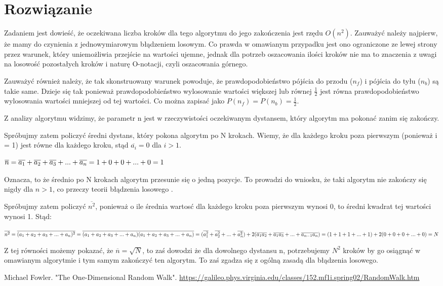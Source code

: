 \documentclass[12pt,oneside,a4paper]{book} %
\theoremstyle{break}
\begin{document}
\chapter*{Rozwiązanie}

Zadaniem jest dowieść, że oczekiwana liczba kroków dla tego algorytmu do jego zakończenia jest rzędu $O(n^2)$. Zauważyć należy najpierw, że mamy do czynienia z jednowymiarowym błądzeniem losowym. Co prawda w omawianym przypadku jest ono ograniczone ze lewej strony przez warunek, który uniemożliwia przejście na wartości ujemne, jednak dla potrzeb oszacowania ilości kroków nie ma to znaczenia z uwagi na losowość pozostałych kroków i naturę O-notacji, czyli oszacowania górnego.

Zauważyć również należy, że tak skonstruowany warunek powoduje, że prawdopodobieństwo pójścia do przodu ($n_f$) i pójścia do tyłu ($n_b$) są takie same. Dzieje się tak ponieważ prawdopodobieństwo wylosowanie wartości większej lub równej $\frac{1}{2}$ jest równa prawdopodobieństwo wylosowania wartości mniejszej od tej wartości. Co można zapisać jako $P(n_f)=P(n_b)=\frac{1}{2}$.

Z analizy algorytmu widzimy, że parametr n jest w rzeczywistości oczekiwanym dystansem, który algorytm ma pokonać zanim się zakończy.

Spróbujmy zatem policzyć średni dystans, który pokona algorytm po N krokach. Wiemy, że dla każdego kroku poza pierwszym (ponieważ i = 1) jest równe dla każdego kroku, stąd $\overline{a_i}=0$ dla $i > 1$.

\begin{math}
  \centering
  \overline{n}= \overline{a_1}+\overline{a_2}+\overline{a_3}+...+\overline{a_n}=1+0+0+...+0=1
\end{math}

Oznacza, to że średnio po N krokach algorytm przesunie się o jedną pozycje. To prowadzi do wniosku, że taki algorytm nie zakończy się nigdy dla $n > 1$, co przeczy teorii błądzenia losowego \cite{viriginaRandomWalk}.

Spróbujmy zatem policzyć $\overline{n^2}$, ponieważ o ile średnia wartosć dla każdego kroku poza pierwszym wynosi 0, to średni kwadrat tej wartości wynosi 1. Stąd:

\begin{math}
  \centering
  \overline{n^2} = \overline{(a_1 + a_2 + a_3 + ... + a_n)^2} = \overline{(a_1 + a_2 + a_3 + ... + a_n)(a_1 + a_2 + a_3 + ... + a_n)} = (\overline{a_1^2} + \overline{a_2^2} + ... + \overline{a_n^2}) + 2(\overline{a_1a_2} + \overline{a_1a_3} + ... + \overline{a_{n-1}a_n}) = (1 + 1 + 1 + ... + 1) + 2(0 + 0 + 0 + ... + 0) = N
\end{math}

Z tej równości możemy pokazać, że $\overline{n} = \sqrt{N}$, to zaś dowodzi że dla dowolnego dystansu n, potrzebujemy $N^2$ kroków by go osiągnąć w omawianym algorytmie i tym samym zakończyć ten algorytm. To zaś zgadza się z ogólną zasadą dla błądzenia losowego.

\begin{thebibliography}{00}
  Michael Fowler. "The One-Dimensional Random Walk". \url{https://galileo.phys.virginia.edu/classes/152.mf1i.spring02/RandomWalk.htm}
\end{thebibliography}
\end{document}
